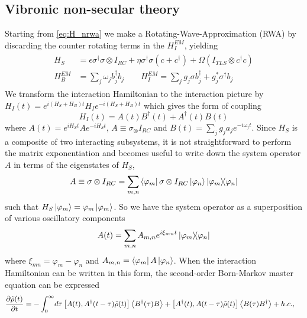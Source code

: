 \documentclass[]{article}
\begin{document}
\begin{itemize}
\begin{itemize}
\subsection{Vibronic non-secular theory}
\label{ssec:nsec}
Starting from \ref{eq:H_nrwa} we make a Rotating-Wave-Approximation (RWA) by discarding the counter rotating terms in the $H^{EM}_I$, yielding
\begin{align}
	\begin{split}
		H_S &= \epsilon \sigma^{\dagger}\sigma\otimes I_{RC} + \eta\sigma^{\dagger}\sigma(c + c^{\dagger}) + \Omega ( I_{TLS}\otimes c^{\dagger}c) \\
		H_B^{EM} &= \sum_{j}\omega_j b^{\dagger}_j b_j \quad \quad H_I^{EM} = \sum_{j}g_j\sigma b^{\dagger}_j+ g_j^*\sigma^{\dagger} b_j 
	\end{split}
\end{align}
We transform the interaction Hamiltonian to the interaction picture by $H_I(t) = e^{i(H_S+H_B) t}H_I e^{-i (H_S+H_B)t}$ which gives the form of coupling
\begin{equation}
\label{eq:IDecomposition}
H_I(t) = A(t) B^{\dagger}(t) + A^{\dagger}(t) B(t)  
\end{equation}
where $A(t) = e^{iH_S t}Ae^{-i H_S t}$, $A \equiv\sigma_\otimes I_{RC}$ and $B(t)= \sum_{j}g_ja_je^{-i\omega_j t}$. Since $H_S$ is a composite of two interacting subsystems, it is not straightforward to perform the matrix exponentiation and becomes useful to write down the system operator $A$ in terms of the eigenstates of $H_S$,
\begin{equation}
A \equiv \sigma\otimes I_{RC} = \sum_{m,n} \bra{\varphi_m}\sigma\otimes I_{RC}\ket{\varphi_n}\dyad{\varphi_m}{\varphi_n}
\end{equation}
such that $H_S\ket{\varphi_m}=\varphi_m\ket{\varphi_m}$. So we have the system operator as a superposition of various oscillatory components
\begin{equation}
\label{eq:Adecomposition}
A(t) = \sum_{m,n} A_{m,n} e^{i\xi_{mn}t}\dyad{\varphi_m}{\varphi_n}
\end{equation}
where $\xi_{mn} = \varphi_m - \varphi_n$ and $A_{m,n} = \bra{\varphi_m}A\ket{\varphi_n}$. When the interaction Hamiltonian can be written in this form, the second-order Born-Markov master equation can be expressed
\begin{align}
	\begin{split}
		\label{eq:BornMarkov}
		\pdv{\tilde{\rho}(t)}{t} = - \int_{0}^{\infty}& d\tau  \left[A(t), A^{\dagger}(t-\tau)\tilde{\rho}(t)\right] \expval{B^{\dagger}(\tau)B} + \left[A^{\dagger}(t),A(t-\tau)\tilde{\rho}(t)\right] \expval{B(\tau)B^{\dagger}} + h.c.,

\end{split}
\end{align}
\end{itemize}
\end{itemize}
\end{document}
